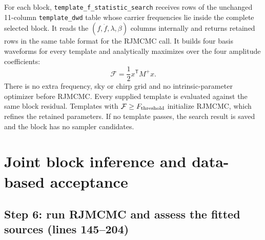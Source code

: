\documentclass[11pt,a4paper]{article}
\newcommand{\code}[1]{\texttt{\nolinkurl{#1}}}
\begin{document}
For each block, \code{template_f_statistic_search} receives rows of the
unchanged 11-column \code{template_dwd} table whose carrier frequencies lie
inside the complete selected block. It reads the
\((f,\dot f,\lambda,\beta)\) columns internally and returns retained rows
in the same table format for the RJMCMC call. It builds four basis waveforms for every
template and analytically maximizes over the four amplitude coefficients:
\[
\mathcal F=\frac12 x^{\mathsf T}M^+x.
\]
There is no extra frequency, sky or chirp grid and no intrinsic-parameter
optimizer before RJMCMC. Every supplied template is evaluated against the same
block residual. Templates with \(\mathcal F\ge F_{\rm threshold}\) initialize
RJMCMC, which refines the retained parameters. If no template passes, the
search result is saved and the block has no sampler candidates.

\section{Joint block inference and data-based acceptance}
\label{sec:walkthrough2}

\subsection{Step 6: run RJMCMC and assess the fitted sources (lines 145--204)}
\end{document}
